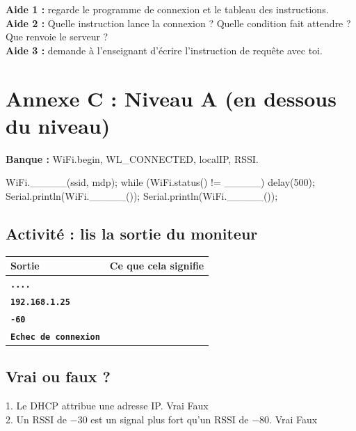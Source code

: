 \documentclass[11pt,a4paper]{article}
\begin{document}
\begin{tcolorbox}[colback=yellow!10,colframe=yellow!50!black,title={Cartes d'aide à utiliser dans l'ordre},fonttitle=\bfseries\small]
\textbf{Aide 1 :} regarde le programme de connexion et le tableau des instructions.\\
\textbf{Aide 2 :} Quelle instruction lance la connexion ? Quelle condition fait attendre ? Que renvoie le serveur ?\\
\textbf{Aide 3 :} demande à l'enseignant d'écrire l'instruction de requête avec toi.
\end{tcolorbox}

\newpage
\section*{Annexe C : Niveau A (en dessous du niveau)}

\textbf{Banque :} WiFi.begin, WL\_CONNECTED, localIP, RSSI.

\begin{arduino}
WiFi._____(ssid, mdp);
while (WiFi.status() != _____) {
  delay(500);
}
Serial.println(WiFi._____());
Serial.println(WiFi._____());
\end{arduino}

\subsection*{Activité : lis la sortie du moniteur}
\begin{tabularx}{\linewidth}{>{\bfseries}p{4cm}Y}
\toprule
Sortie & Ce que cela signifie\\
\midrule
\texttt{....} & \\
\texttt{192.168.1.25} & \\
\texttt{-60} & \\
\texttt{Echec de connexion} & \\
\bottomrule
\end{tabularx}

\subsection*{Vrai ou faux ?}
1. Le DHCP attribue une adresse IP. \cb Vrai \cb Faux\\
2. Un RSSI de $-30$ est un signal plus fort qu'un RSSI de $-80$. \cb Vrai \cb Faux

\newpage
\end{document}
